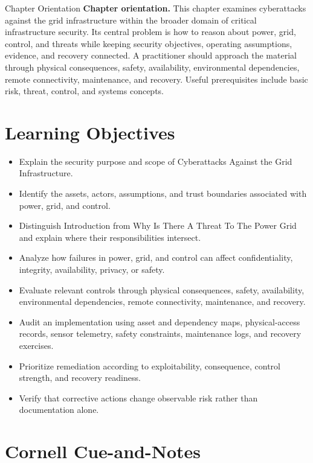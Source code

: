 \documentclass[11pt,letterpaper]{article}
\title{\CornellDocumentTitle}
\author{}
\date{}
\begin{document}
\maketitle
\begin{CornellOverviewBox}{Chapter Orientation}
\textbf{Chapter orientation.} This chapter examines cyberattacks against the grid infrastructure within the broader domain of critical infrastructure security. Its central problem is how to reason about power, grid, control, and threats while keeping security objectives, operating assumptions, evidence, and recovery connected. A practitioner should approach the material through physical consequences, safety, availability, environmental dependencies, remote connectivity, maintenance, and recovery. Useful prerequisites include basic risk, threat, control, and systems concepts.
\end{CornellOverviewBox}
\section*{Learning Objectives}
\begin{itemize}
\item Explain the security purpose and scope of Cyberattacks Against the Grid Infrastructure.
\item Identify the assets, actors, assumptions, and trust boundaries associated with power, grid, and control.
\item Distinguish Introduction from Why Is There A Threat To The Power Grid and explain where their responsibilities intersect.
\item Analyze how failures in power, grid, and control can affect confidentiality, integrity, availability, privacy, or safety.
\item Evaluate relevant controls through physical consequences, safety, availability, environmental dependencies, remote connectivity, maintenance, and recovery.
\item Audit an implementation using asset and dependency maps, physical-access records, sensor telemetry, safety constraints, maintenance logs, and recovery exercises.
\item Prioritize remediation according to exploitability, consequence, control strength, and recovery readiness.
\item Verify that corrective actions change observable risk rather than documentation alone.
\end{itemize}
\section*{Cornell Cue-and-Notes}
\end{document}
